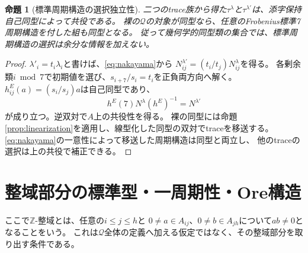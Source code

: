 \documentclass[11pt,a4paper]{ltjsarticle}
\newtheorem{proposition}[theorem]{命題}
\theoremstyle{definition}
\newcommand{\ZZ}{\mathbb Z}
\begin{document}
\begin{proposition}[標準周期構造の選択独立性]\label{prop:trace-choice}
二つのtrace族から得た$\tau^\lambda$と$\tau^{\lambda'}$は、添字保持自己同型によって共役である。
裸の$\mathcal Q$の対象が同型なら、任意のFrobenius標準7周期構造を付した組も同型となる。
従って幾何学的同型類の集合では、標準周期構造の選択は余分な情報を加えない。
\end{proposition}
\begin{proof}
$\lambda'_i=t_i\lambda_i$と書けば、\eqref{eq:nakayama}から
$N^{\lambda'}_{ij}=(t_i/t_j)N^\lambda_{ij}$を得る。
各剰余類$i\bmod7$で初期値を選び、$s_{i+7}/s_i=t_i$を正負両方向へ解く。
$h^E_{ij}(a)=(s_i/s_j)a$は自己同型であり、
\[
h^E(7)N^\lambda(h^E)^{-1}=N^{\lambda'}
\]
が成り立つ。逆双対で$A$上の共役性を得る。
裸の同型には命題\ref{prop:linearization}を適用し、線型化した同型の双対でtraceを移送する。
\eqref{eq:nakayama}の一意性によって移送した周期構造は同型と両立し、
他のtraceの選択は上の共役で補正できる。
\end{proof}

\section{整域部分の標準型・一周期性・Ore構造}
\label{sec:domain-structure}
ここで$\ZZ$-整域とは、任意の$i\leq j\leq h$と
$0\ne a\in A_{ij}$、$0\ne b\in A_{jh}$について$ab\ne0$となることをいう。
これは$\mathcal Q$全体の定義へ加える仮定ではなく、その整域部分を取り出す条件である。
\end{document}
